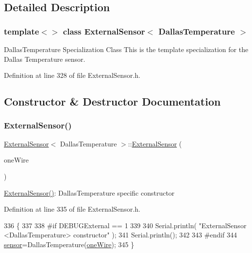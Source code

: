 \subsection{Detailed Description}
\subsubsection*{template$<$$>$\newline
class External\+Sensor$<$ Dallas\+Temperature $>$}

Dallas\+Temperature Specialization Class This is the template specialization for the Dallas Temperature sensor. 

Definition at line 328 of file External\+Sensor.\+h.



\subsection{Constructor \& Destructor Documentation}
\mbox{\label{class_external_sensor_3_01_dallas_temperature_01_4_a5de0c37120d2d927bd0f37ff4a215baf}} 
\subsubsection{\texorpdfstring{External\+Sensor()}{ExternalSensor()}}
{\footnotesize\ttfamily \hyperlink{class_external_sensor}{External\+Sensor}$<$ Dallas\+Temperature $>$\+::\hyperlink{class_external_sensor}{External\+Sensor} (\begin{DoxyParamCaption}\item[{One\+Wire $\ast$}]{one\+Wire }\end{DoxyParamCaption})\hspace{0.3cm}{\ttfamily [inline]}}

\hyperlink{class_external_sensor_3_01_dallas_temperature_01_4_a5de0c37120d2d927bd0f37ff4a215baf}{External\+Sensor()}\+: Dallas\+Temperature specific constructor 

Definition at line 335 of file External\+Sensor.\+h.


\begin{DoxyCode}
336     \{
337         
338 \textcolor{preprocessor}{    #if DEBUGExternal == 1 }
339 
340         Serial.println( \textcolor{stringliteral}{"ExternalSensor <DallasTemperature> constructor"} );
341         Serial.println();
342     
343 \textcolor{preprocessor}{    #endif}
344         \hyperlink{class_external_sensor_3_01_dallas_temperature_01_4_adb6ba4fcdedef95ad8f6b0c9b6c0f9d1}{sensor}=DallasTemperature(\hyperlink{_external_sensors_8cpp_af39fa3dad1ba161b384c0b26b8145e65}{oneWire});
345     \}
\end{DoxyCode}


